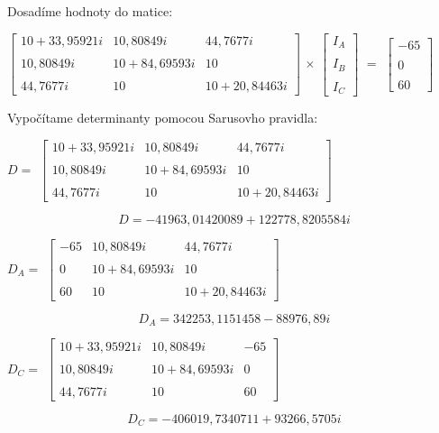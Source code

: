 \newpage

{\Large Dosadíme hodnoty do matice:} 

\begin{center}
$\begin{bmatrix}
10 + 33,95921i & 10,80849i & 44,7677i\\\\
10,80849i & 10 + 84,69593i & 10\\\\
44,7677i & 10 & 10 + 20,84463i
\end{bmatrix}$
$\times$
$\begin{bmatrix}
I_A\\\\
I_B\\\\
I_C
\end{bmatrix}$
$=$
$\begin{bmatrix}
-65\\\\
0\\\\
60
\end{bmatrix}$
\end{center}
\bigskip

{\Large Vypočítame determinanty pomocou Sarusovho pravidla:} 
\bigskip

\begin{center}
$D =$
$\begin{bmatrix}
10 + 33,95921i & 10,80849i & 44,7677i\\\\
10,80849i & 10 + 84,69593i & 10\\\\
44,7677i & 10 & 10 + 20,84463i
\end{bmatrix}$
\end{center}
{\large\[ D = -41963,01420089+122778,8205584i\]}
\bigskip

\begin{center}
$D_A =$
$\begin{bmatrix}
-65 & 10,80849i & 44,7677i\\\\
0 & 10 + 84,69593i & 10\\\\
60 & 10 & 10 + 20,84463i
\end{bmatrix}$
\end{center}
{\large\[ D_A = 342253,1151458-88976,89i\]}
\bigskip

\begin{center}
$D_C =$
$\begin{bmatrix}
10 + 33,95921i & 10,80849i & -65\\\\
10,80849i & 10 + 84,69593i & 0\\\\
44,7677i & 10 & 60
\end{bmatrix}$
\end{center}
{\large\[ D_C = -406019,7340711+93266,5705i\]}
\bigskip

